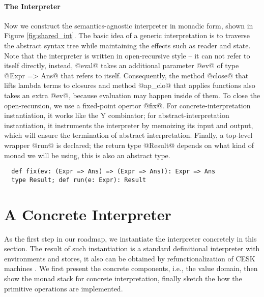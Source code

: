\paragraph{The Interpreter} Now we construct the semantics-agnostic interpreter
in monadic form, shown in Figure \ref{fig:shared_int}. The basic idea
of a generic interpretation is to traverse the abstract syntax tree
while maintaining the effects such as reader and state.  Note that the
interpreter is written in open-recursive style -- it can not refer to
itself directly, instead, @eval@ takes an additional parameter @ev@ of
type @Expr => Ans@ that refers to itself. Consequently, the method
@close@ that lifts lambda terms to closures and method @ap_clo@ that
applies functions also takes an extra @ev@, because evaluation may
happen inside of them.
To close the open-recursion, we use a fixed-point opertor @fix@.
For concrete-interpretation instantiation, it works like the Y
combinator; for abstract-interpretation instantiation, it instruments
the interpreter by memoizing its input and output, which will ensure
the termination of abstract interpretation.
Finally, a top-level wrapper @run@ is declared; the return type
@Result@ depends on what kind of monad we will be using, this is also
an abstract type.
\begin{lstlisting}
  def fix(ev: (Expr => Ans) => (Expr => Ans)): Expr => Ans
  type Result; def run(e: Expr): Result
\end{lstlisting}


\section{A Concrete Interpreter} \label{unstaged_conc}

As the first step in our roadmap, we instantiate the interpreter concretely in
this section. The result of such instantiation is a standard definitional
interpreter with environments and stores, it also can be obtained by
refunctionalization of CESK machines \cite{Felleisen:1987:CAH:41625.41654,
DBLP:conf/ppdp/AgerBDM03}. We first present the concrete components, i.e., the
value domain, then show the monad stack for concrete interpretation, finally
sketch the how the primitive operations are implemented.


